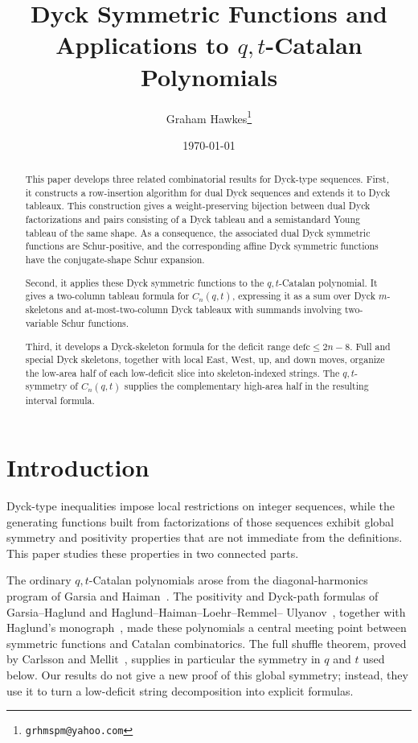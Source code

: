 \documentclass[11pt]{article}
\title{Dyck Symmetric Functions and Applications to \(q,t\)-Catalan Polynomials}
\author{Graham Hawkes\thanks{\texttt{grhmspm@yahoo.com}}}
\date{\today}
\theoremstyle{plain}
\theoremstyle{definition}
\theoremstyle{remark}
\newcommand{\defc}{\mathrm{defc}}
\begin{document}
\maketitle

\begin{abstract}
This paper develops three related combinatorial results for Dyck-type
sequences.  First, it constructs a row-insertion algorithm for dual Dyck
sequences and extends it to Dyck tableaux.  This construction gives a
weight-preserving bijection between dual Dyck factorizations and pairs
consisting of a Dyck tableau and a semistandard Young tableau of the same
shape.  As a consequence, the associated dual Dyck symmetric functions are
Schur-positive, and the corresponding affine Dyck symmetric functions have the
conjugate-shape Schur expansion.

Second, it applies these Dyck symmetric functions to the
\(q,t\)-Catalan polynomial.  It gives a two-column tableau formula for
\(C_n(q,t)\), expressing it as a sum over Dyck \(m\)-skeletons and
at-most-two-column Dyck tableaux with summands involving two-variable Schur
functions.

Third, it develops a Dyck-skeleton formula for the deficit range
\(\defc\le 2n-8\).  Full and special Dyck skeletons, together with local
\(\mathrm{East}\), \(\mathrm{West}\), \(\mathrm{up}\), and
\(\mathrm{down}\) moves, organize the low-area half of each low-deficit slice
into skeleton-indexed strings.  The \(q,t\)-symmetry of \(C_n(q,t)\) supplies
the complementary high-area half in the resulting interval formula.
\end{abstract}


\section{Introduction}
\label{sec:introduction}

Dyck-type inequalities impose local restrictions on integer sequences, while
the generating functions built from factorizations of those sequences exhibit
global symmetry and positivity properties that are not immediate from the
definitions.  This paper studies these properties in two connected parts.

The ordinary \(q,t\)-Catalan polynomials arose from the diagonal-harmonics
program of Garsia and Haiman~\cite{GarsiaHaiman1996}.  The positivity and
Dyck-path formulas of Garsia--Haglund and Haglund--Haiman--Loehr--Remmel--
Ulyanov~\cite{GarsiaHaglund2002,HHLRU2005}, together with Haglund's
monograph~\cite{Haglund2008}, made these polynomials a central meeting point
between symmetric functions and Catalan combinatorics.  The full shuffle
theorem, proved by Carlsson and Mellit~\cite{CarlssonMellit2018}, supplies in
particular the symmetry in \(q\) and \(t\) used below.  Our results do not give
a new proof of this global symmetry; instead, they use it to turn a
low-deficit string decomposition into explicit formulas.
\end{document}
